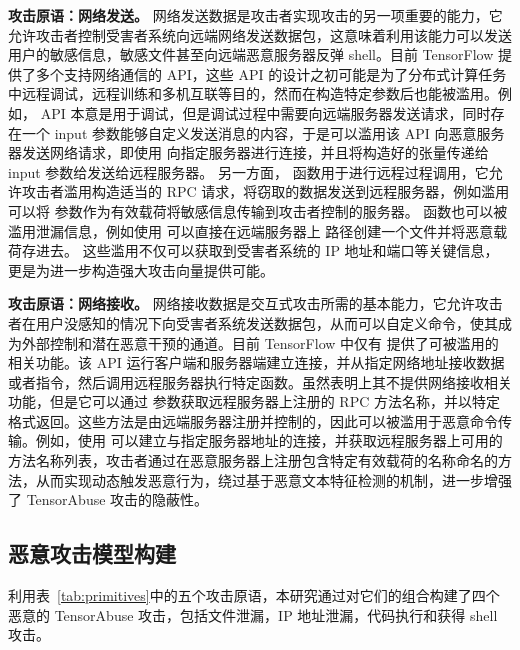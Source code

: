 \textbf{攻击原语：网络发送。}
网络发送数据是攻击者实现攻击的另一项重要的能力，它允许攻击者控制受害者系统向远端网络发送数据包，这意味着利用该能力可以发送用户的敏感信息，敏感文件甚至向远端恶意服务器反弹 shell。目前 TensorFlow 提供了多个支持网络通信的 API，这些 API 的设计之初可能是为了分布式计算任务中远程调试，远程训练和多机互联等目的，然而在构造特定参数后也能被滥用。例如， API 本意是用于调试，但是调试过程中需要向远端服务器发送请求，同时存在一个 input 参数能够自定义发送消息的内容，于是可以滥用该 API 向恶意服务器发送网络请求，即使用  向指定服务器进行连接，并且将构造好的张量传递给 input 参数给发送给远程服务器。
另一方面， 函数用于进行远程过程调用，它允许攻击者滥用构造适当的 RPC 请求，将窃取的数据发送到远程服务器，例如滥用 可以将  参数作为有效载荷将敏感信息传输到攻击者控制的服务器。 函数也可以被滥用泄漏信息，例如使用  可以直接在远端服务器上  路径创建一个文件并将恶意载荷存进去。
这些滥用不仅可以获取到受害者系统的 IP 地址和端口等关键信息，更是为进一步构造强大攻击向量提供可能。

\textbf{攻击原语：网络接收。}
网络接收数据是交互式攻击所需的基本能力，它允许攻击者在用户没感知的情况下向受害者系统发送数据包，从而可以自定义命令，使其成为外部控制和潜在恶意干预的通道。目前 TensorFlow 中仅有  提供了可被滥用的相关功能。该 API 运行客户端和服务器端建立连接，并从指定网络地址接收数据或者指令，然后调用远程服务器执行特定函数。虽然表明上其不提供网络接收相关功能，但是它可以通过  参数获取远程服务器上注册的 RPC 方法名称，并以特定格式返回。这些方法是由远端服务器注册并控制的，因此可以被滥用于恶意命令传输。例如，使用  可以建立与指定服务器地址的连接，并获取远程服务器上可用的方法名称列表，攻击者通过在恶意服务器上注册包含特定有效载荷的名称命名的方法，从而实现动态触发恶意行为，绕过基于恶意文本特征检测的机制，进一步增强了 TensorAbuse 攻击的隐蔽性。

\subsection{恶意攻击模型构建}
利用表~\ref{tab:primitives}中的五个攻击原语，本研究通过对它们的组合构建了四个恶意的 TensorAbuse 攻击，包括文件泄漏，IP 地址泄漏，代码执行和获得 shell 攻击。

